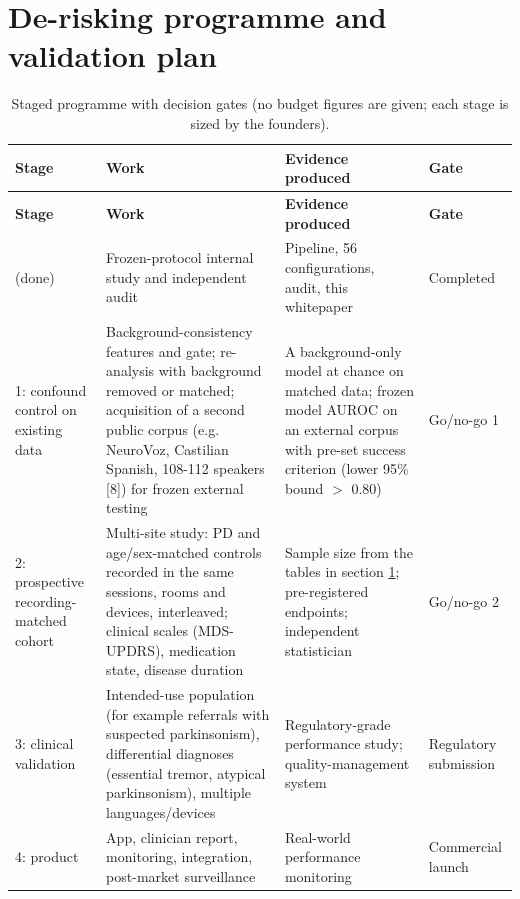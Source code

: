 \documentclass[10pt,a4paper]{article}
\begin{document}
\section{De-risking programme and validation plan}\label{sec:roadmap}
\begin{center}\scriptsize\renewcommand{\arraystretch}{1.12}
\begin{longtable}{p{2.6cm}p{6.2cm}p{5.0cm}p{2.0cm}}
\caption{Staged programme with decision gates (no budget figures are given; each stage is sized by the founders).}\\
\toprule
\textbf{Stage} & \textbf{Work} & \textbf{Evidence produced} & \textbf{Gate}\\\midrule\endfirsthead
\toprule
\textbf{Stage} & \textbf{Work} & \textbf{Evidence produced} & \textbf{Gate}\\\midrule\endhead
\bottomrule\endfoot
0 (done) & Frozen-protocol internal study and independent audit & Pipeline, 56 configurations, audit, this whitepaper & Completed\\
1: confound control on existing data & Background-consistency features and gate; re-analysis with background removed or matched; acquisition of a second public corpus (e.g. NeuroVoz, Castilian Spanish, 108-112 speakers [8]) for frozen external testing & A background-only model at chance on matched data; frozen model AUROC on an external corpus with pre-set success criterion (lower 95\% bound $>$ 0.80) & Go/no-go 1\\
2: prospective recording-matched cohort & Multi-site study: PD and age/sex-matched controls recorded in the same sessions, rooms and devices, interleaved; clinical scales (MDS-UPDRS), medication state, disease duration & Sample size from the tables in section \ref{sec:roadmap}; pre-registered endpoints; independent statistician & Go/no-go 2\\
3: clinical validation & Intended-use population (for example referrals with suspected parkinsonism), differential diagnoses (essential tremor, atypical parkinsonism), multiple languages/devices & Regulatory-grade performance study; quality-management system & Regulatory submission\\
4: product & App, clinician report, monitoring, integration, post-market surveillance & Real-world performance monitoring & Commercial launch\\
\end{longtable}\end{center}
\end{document}
